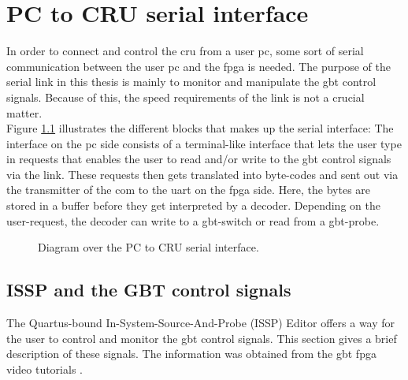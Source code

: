 \documentclass[main.tex]{subfiles}
\begin{document}
\chapter{PC to CRU serial interface} \label{chap:sercom}

In order to connect and control the \gls{cru} from a user \acrshort{pc}, some sort of serial communication between the user \acrshort{pc} and the \gls{fpga} is needed. The purpose of the serial link in this thesis is mainly to monitor and manipulate the \gls{gbt} control signals. Because of this, the speed requirements of the link is not a crucial matter. \\
Figure \ref{fig:sergui} illustrates the different blocks that makes up the serial interface: The interface on the \gls{pc} side consists of a terminal-like interface that lets the user type in requests that enables the user to read and/or write to the \gls{gbt} control signals via the link. These requests then gets translated into byte-codes and sent out via the transmitter of the \gls{com} to the \gls{uart} on the fpga side. Here, the bytes are stored in a buffer before they get interpreted by a decoder. Depending on the user-request, the decoder can write to a \gls{gbt}-switch or read from a \gls{gbt}-probe.

\begin{figure}[] %

\caption{Diagram over the PC to CRU serial interface.}
\label{fig:sergui}
\end{figure}

\section{ISSP and the GBT control signals}

The Quartus-bound In-System-Source-And-Probe (ISSP) Editor offers a way for the user to control and monitor the \gls{gbt} control signals. This section gives a brief description of these signals. The information was obtained from the \gls{gbt} \gls{fpga} video tutorials \cite{gbt_videos}.
\end{document}
